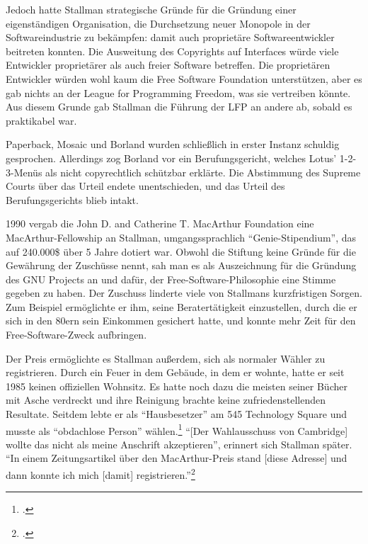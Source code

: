 Jedoch hatte Stallman strategische Gründe für die Gründung einer eigenständigen Organisation, die Durchsetzung neuer Monopole in der Softwareindustrie zu bekämpfen: damit auch proprietäre Softwareentwickler beitreten konnten. Die Ausweitung des Copyrights auf Interfaces würde viele Entwickler proprietärer als auch freier Software betreffen.  Die proprietären Entwickler würden wohl kaum die Free Software Foundation unterstützen, aber es gab nichts an der League for Programming Freedom, was sie vertreiben könnte.  Aus diesem Grunde gab Stallman die Führung der LFP an andere ab, sobald es praktikabel war.

Paperback, Mosaic und Borland wurden schließlich in erster Instanz schuldig gesprochen. Allerdings zog Borland vor ein Berufungsgericht, welches Lotus' 1-2-3-Menüs als nicht copyrechtlich schützbar erklärte. Die Abstimmung des Supreme Courts über das Urteil endete unentschieden, und das Urteil des Berufungsgerichts blieb intakt.

1990 vergab die John D. and Catherine T. MacArthur Foundation eine MacArthur-Fellowship an Stallman, umgangssprachlich "`Genie-Stipendium"', das auf 240.000\$ über 5 Jahre dotiert war. Obwohl die Stiftung keine Gründe für die Gewährung der Zuschüsse nennt, sah man es als Auszeichnung für die Gründung des GNU Projects an und dafür, der Free-Software-Philosophie eine Stimme gegeben zu haben. Der Zuschuss linderte viele von Stallmans kurzfristigen Sorgen. Zum Beispiel ermöglichte er ihm, seine Beratertätigkeit einzustellen, durch die er sich in den 80ern sein Einkommen gesichert hatte, und konnte mehr Zeit für den Free-Software-Zweck aufbringen.

Der Preis ermöglichte es Stallman außerdem, sich als normaler Wähler zu registrieren. Durch ein Feuer in dem Gebäude, in dem er wohnte, hatte er seit 1985 keinen offiziellen Wohnsitz. Es hatte noch dazu die meisten seiner Bücher mit Asche verdreckt und ihre Reinigung brachte keine zufriedenstellenden Resultate. Seitdem lebte er als "`Hausbesetzer"' am 545 Technology Square und musste als "`obdachlose Person"' wählen.\footcite[Vgl.][]{macarth} "`[Der Wahlausschuss von Cambridge] wollte das nicht als meine Anschrift akzeptieren"', erinnert sich Stallman später. "`In einem Zeitungsartikel über den MacArthur-Preis stand [diese Adresse] und dann konnte ich mich [damit] registrieren."'\footcite[Vgl.][]{rmshsm}

